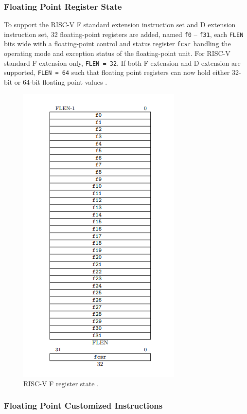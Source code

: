 \subsubsection{Floating Point Register State}

To support the RISC-V F standard extension instruction set and D extension instruction set, 32 floating-point registers are added, named \texttt{f0} – \texttt{f31}, each \texttt{FLEN} bits wide with a floating-point control and status register \texttt{fcsr} handling the operating mode and exception status of the floating-point unit. For RISC-V standard F extension only,  \texttt{FLEN = 32}. If both F extension and D extension are supported, \texttt{FLEN = 64} such that floating point registers can now hold either 32-bit or 64-bit floating point values \cite{RISC-V_unprivileged_ISA}. 

\begin{figure}[!htp]
    \centering
    \includegraphics[width=0.5\linewidth]{figure/F register state.png}
    \caption{RISC-V F register state \cite{RISC-V_unprivileged_ISA}.}
    \label{fig:risc-v F register state}
\end{figure}

\subsubsection{Floating Point Customized Instructions}

